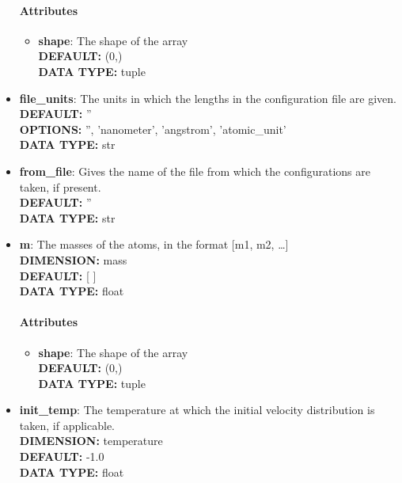 \begin{itemize}
\paragraph{Attributes}
 \begin{itemize}
\item {\bf shape}:
 The shape of the array
{\\ \bf DEFAULT: }(0,)
{\\ \bf DATA TYPE: }tuple
\end{itemize}
 
\item {\bf file\_units}:
 The units in which the lengths in the configuration file are given.
{\\ \bf DEFAULT: }''
{\\ \bf OPTIONS: }'', 'nanometer', 'angstrom', 'atomic\_unit'
{\\ \bf DATA TYPE: }str
\item {\bf from\_file}:
 Gives the name of the file from which the configurations are taken, if present.
{\\ \bf DEFAULT: }''
{\\ \bf DATA TYPE: }str
\item {\bf m}:
 The masses of the atoms, in the format [m1, m2, \ldots  ]
{\\ \bf DIMENSION: }mass
{\\ \bf DEFAULT: }[ ]
{\\ \bf DATA TYPE: }float
\paragraph{Attributes}
 \begin{itemize}
\item {\bf shape}:
 The shape of the array
{\\ \bf DEFAULT: }(0,)
{\\ \bf DATA TYPE: }tuple
\end{itemize}
 
\item {\bf init\_temp}:
 The temperature at which the initial velocity distribution is taken, if applicable.
{\\ \bf DIMENSION: }temperature
{\\ \bf DEFAULT: }-1.0
{\\ \bf DATA TYPE: }float
\end{itemize}
 
